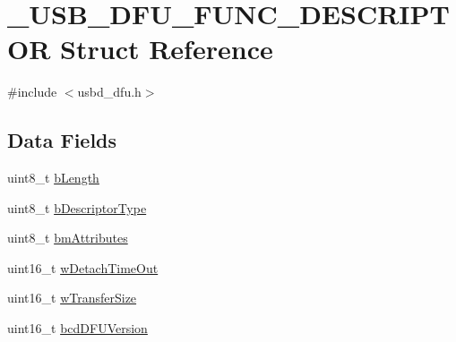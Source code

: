 \hypertarget{struct__USB__DFU__FUNC__DESCRIPTOR}{\section{\-\_\-\-U\-S\-B\-\_\-\-D\-F\-U\-\_\-\-F\-U\-N\-C\-\_\-\-D\-E\-S\-C\-R\-I\-P\-T\-O\-R Struct Reference}
\label{struct__USB__DFU__FUNC__DESCRIPTOR}
}


{\ttfamily \#include $<$usbd\-\_\-dfu.\-h$>$}

\subsection*{Data Fields}
\begin{DoxyCompactItemize}
\item 
uint8\-\_\-t \hyperlink{struct__USB__DFU__FUNC__DESCRIPTOR_a87a03979bd723f81bb50ef42b306293e}{b\-Length}
\item 
uint8\-\_\-t \hyperlink{struct__USB__DFU__FUNC__DESCRIPTOR_a89748491aeed40b066125858de36f32a}{b\-Descriptor\-Type}
\item 
uint8\-\_\-t \hyperlink{struct__USB__DFU__FUNC__DESCRIPTOR_a5c52598802d2f0b806b60c0b7dc7daab}{bm\-Attributes}
\item 
uint16\-\_\-t \hyperlink{struct__USB__DFU__FUNC__DESCRIPTOR_adf39c3370bc0103fa7e7fb4b2f55997f}{w\-Detach\-Time\-Out}
\item 
uint16\-\_\-t \hyperlink{struct__USB__DFU__FUNC__DESCRIPTOR_aa2d15000591e2a01b63bc46e53dde84a}{w\-Transfer\-Size}
\item 
uint16\-\_\-t \hyperlink{struct__USB__DFU__FUNC__DESCRIPTOR_acc4e2bf500911850131421896697e503}{bcd\-D\-F\-U\-Version}
\end{DoxyCompactItemize}



